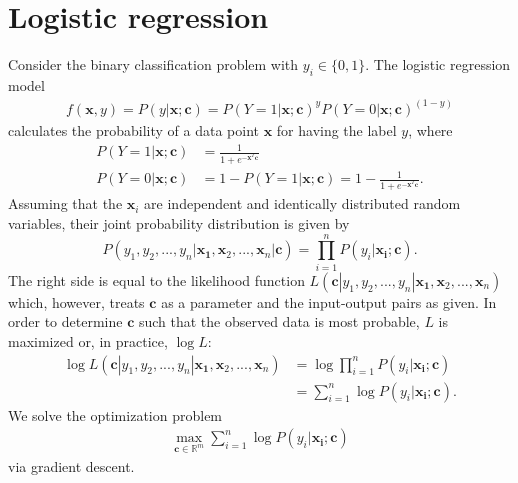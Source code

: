 \documentclass[11pt, a4paper, parskip=half*, bibliography=totoc, cleardoublepage=empty, final,
numbers=noenddot]{scrbook}
\begin{document}
\section{Logistic regression}
Consider the binary classification problem with $y_i \in \{0, 1 \}$. The logistic regression model
\begin{align}
f(\bm{x}, y) = P(y| \bm{x}; \bm{c})= P(Y=1| \bm{x}; \bm{c})^y  P(Y=0| \bm{x}; \bm{c})^{(1-y)} 
\end{align}
calculates the probability of a data point $\bm{x}$ for having the label $y$, where
\begin{align}
 P(Y=1| \bm{x}; \bm{c}) &= \frac{1}{1 + e^{- \bm{x}^T \bm{c}}} \\
P(Y=0| \bm{x}; \bm{c}) &= 1 - P(Y=1| \bm{x}; \bm{c}) = 1 - \frac{1}{1 + e^{- \bm{x}^T \bm{c}}}. 
\end{align}
Assuming that the $\bm{x}_i$ are independent and identically distributed random variables, their joint probability distribution is given by
\begin{equation}
P(y_1, y_2, ..., y_n| \bm{x_1}, \bm{x}_2, ..., \bm{x}_n| \bm{c}) = \prod_{i=1}^n P(y_i| \bm{x_i}; \bm{c}).
\end{equation}
The right side is equal to the likelihood function $L(\bm{c}|y_1, y_2, ..., y_n| \bm{x_1}, \bm{x}_2, ..., \bm{x}_n)$ which, however, treats $\bm{c}$ as a parameter and the input-output pairs as given. In order to determine $\bm{c}$ such that the observed data is most probable, $L$ is maximized or, in practice, $\log L$:
\begin{align}
 \log L(\bm{c}|y_1, y_2, ..., y_n| \bm{x_1}, \bm{x}_2, ..., \bm{x}_n) &= \log \prod_{i=1}^n P(y_i| \bm{x_i}; \bm{c}) \\
 &=  \sum_{i=1}^n \log P(y_i| \bm{x_i}; \bm{c}).
\end{align}
We solve the optimization problem
\begin{align}
\max_{\bm{c} \in \mathbb{R}^m} \sum_{i=1}^n \log P(y_i| \bm{x_i}; \bm{c})
\end{align}
via gradient descent.
\end{document}
